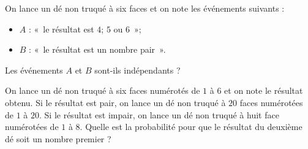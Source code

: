 \documentclass[11pt]{article}
\begin{document}
\begin{exo}
On lance un dé non truqué à six faces et on note les événements
suivants : 
\begin{itemize}
  \item $A$ : «~le résultat est $4$; $5$ ou $6$~»;
  \item $B$ : «~le résultat est un nombre pair~».
\end{itemize}
Les événements $A$ et $B$ sont-ils indépendants ?
\end{exo}

\begin{exo}
  On lance un dé non truqué à six faces numérotés de $1$ à $6$ et on note le
  résultat obtenu. Si le résultat est pair, on lance un dé non truqué à $20$
  faces numérotées de $1$ à $20$. Si le résultat est impair, on lance un dé non
  truqué à huit face numérotées de $1$ à $8$. Quelle est la probabilité pour que
  le résultat du deuxième dé soit un nombre premier ?
\end{exo}
\end{document}
